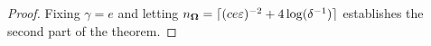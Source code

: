 \begin{proof}

    Fixing $\gamma = e$ and letting $n_{\boldsymbol{\Omega}} = \lceil(c e \varepsilon)^{-2}  + 4 \log(\delta^{-1}) \rceil$ establishes the second part of the theorem.
\end{proof}

 
